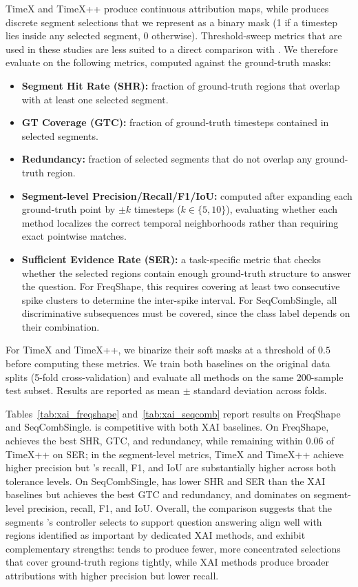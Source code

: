 TimeX and TimeX++ produce continuous attribution maps, while \algoname produces discrete segment selections that we represent as a binary mask (1 if a timestep lies inside any selected segment, 0 otherwise). Threshold-sweep metrics that are used in these studies are less suited to a direct comparison with \algoname. We therefore evaluate on the following metrics, computed against the ground-truth masks:

\begin{itemize}
    \item \textbf{Segment Hit Rate (SHR):} fraction of ground-truth regions that overlap with at least one selected segment.
    \item \textbf{GT Coverage (GTC):} fraction of ground-truth timesteps contained in selected segments.
    \item \textbf{Redundancy:} fraction of selected segments that do not overlap any ground-truth region.
    \item \textbf{Segment-level Precision/Recall/F1/IoU:} computed after expanding each ground-truth point by $\pm k$ timesteps ($k \in \{5, 10\}$), evaluating whether each method localizes the correct temporal neighborhoods rather than requiring exact pointwise matches.
    \item \textbf{Sufficient Evidence Rate (SER):} a task-specific metric that checks whether the selected regions contain enough ground-truth structure to answer the question. For FreqShape, this requires covering at least two consecutive spike clusters to determine the inter-spike interval. For SeqCombSingle, all discriminative subsequences must be covered, since the class label depends on their combination.
\end{itemize}

For TimeX and TimeX++, we binarize their soft masks at a threshold of $0.5$ before computing these metrics. We train both baselines on the original data splits (5-fold cross-validation) and evaluate all methods on the same 200-sample test subset. Results are reported as mean $\pm$ standard deviation across folds.

Tables~\ref{tab:xai_freqshape} and~\ref{tab:xai_seqcomb} report results on FreqShape and SeqCombSingle. \algoname is competitive with both XAI baselines. On FreqShape, \algoname achieves the best SHR, GTC, and redundancy, while remaining within 0.06 of TimeX++ on SER; in the segment-level metrics, TimeX and TimeX++ achieve higher precision but \algoname's recall, F1, and IoU are substantially higher across both tolerance levels. On SeqCombSingle, \algoname has lower SHR and SER than the XAI baselines but achieves the best GTC and redundancy, and dominates on segment-level precision, recall, F1, and IoU. Overall, the comparison suggests that the segments \algoname's controller selects to support question answering align well with regions identified as important by dedicated XAI methods, and exhibit complementary strengths: \algoname tends to produce fewer, more concentrated selections that cover ground-truth regions tightly, while XAI methods produce broader attributions with higher precision but lower recall.

